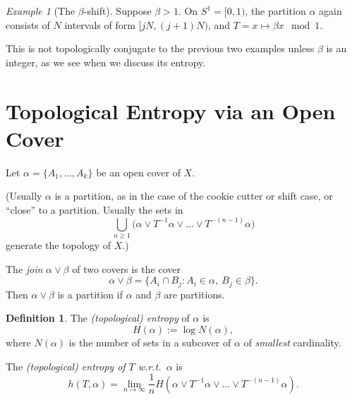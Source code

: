 \documentclass[a4paper]{amsart}
\theoremstyle{plain}
\theoremstyle{definition}
\newtheorem{definition}[theorem]{Definition}%
\theoremstyle{remark}
\newtheorem{example}[theorem]{Example}
\begin{document}
\begin{example}[The $ \beta $-shift]  Suppose $ \beta > 1 $.  On $ S^1= [0,1)$, the partition $ \alpha $ again consists of $ N $ intervals of form $ [jN, (j+1) N ) $, and $ T = x \mapsto \beta x \mod 1 $. 

This is not topologically conjugate to the previous two examples unless $ \beta $ is an integer, as we see when we discuss its entropy.
\end{example}


\section{\textbf{Topological Entropy via an Open Cover}} \label{prelim}

Let $   \alpha = \{A_1,\dots, A_k\} $ be an open cover of $ X $.

(Usually $ \alpha $ is a partition, as in the case of the cookie cutter or shift case, or ``close'' to a partition.
Usually  the sets in 
\[    \bigcup_{n\geq 1}\Big( \alpha \vee T^{-1}\alpha \vee \dots \vee T^{-(n-1)}\alpha\Big) \]
   generate  the topology of $ X $.)  
 
 The \emph{join}   $ \alpha \vee \beta $ of two covers is the cover 
 \[
 \alpha \vee \beta = \{A_i\cap B_j : A_i\in \alpha,\ B_j \in \beta \}.
 \]
Then  $ \alpha \vee \beta $ is a partition if $ \alpha $ and $ \beta $ are partitions.
 
\begin{definition}
The \emph{(topological) entropy} of $ \alpha  $ is 
\[ H(\alpha ) := \log N(\alpha ),\]
where $  N(\alpha  ) $  is the number of sets in a  subcover of $ \alpha  $ of \emph{smallest} cardinality. 

 The \emph{(topological) entropy of $ T $ w.r.t.\  $ \alpha $} is 
 \[
  h(T, \alpha) 
 = \lim_{n \to \infty } \frac{1}{n} H\left(\alpha \vee T^{-1}\alpha \vee \dots \vee T^{-(n-1)}\alpha\right)          .
 \]
\end{definition}  
\end{document}
